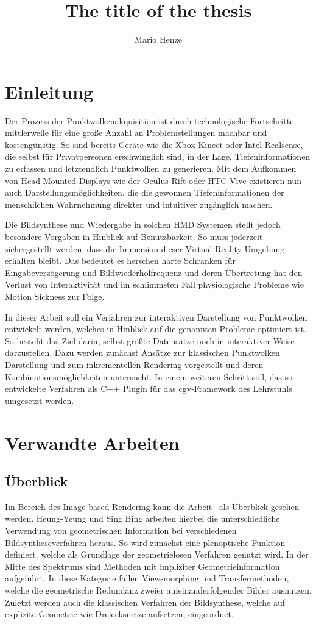 \documentclass[hyperref, beleg, german]{cgvpub}
\author{Mario Henze}
\title{The title of the thesis}
\begin{document}
\chapter{Einleitung}%
\label{sec:einleitung}

Der Prozess der Punktwolkenakquisition ist durch technologische Fortschritte
mittlerweile für eine große Anzahl an Problemstellungen machbar und
kostengünstig. So sind bereits Geräte wie die Xbox Kinect oder Intel
Realsense, die selbst für Privatpersonen erschwinglich sind, in der Lage,
Tiefeninformationen zu erfassen und letztendlich Punktwolken zu generieren. Mit
dem Aufkommen von Head Mounted Displays wie der Oculus Rift oder HTC Vive
existieren nun auch Darstellungsmöglichkeiten, die die gewonnen
Tiefeninformationen der menschlichen Wahrnehmung direkter und intuitiver
zugänglich machen.

Die Bildsynthese und Wiedergabe in solchen HMD Systemen stellt jedoch besondere
Vorgaben in Hinblick auf Benutzbarkeit. So muss jederzeit sichergestellt werden,
dass die Immersion dieser Virtual Reality Umgebung erhalten bleibt. Das bedeutet
es herschen harte Schranken für Eingabeverzögerung und Bildwiederholfrequenz und
deren Übertretung hat den Verlust von Interaktivität und im schlimmsten Fall
physiologische Probleme wie Motion Sickness zur Folge.

In dieser Arbeit soll ein Verfahren zur interaktiven Darstellung von Punktwolken
entwickelt werden, welches in Hinblick auf die genannten Probleme optimiert ist.
So besteht das Ziel darin, selbst größte Datensätze noch in interaktiver Weise
darzustellen. Dazu werden zunächst Ansätze zur klassischen Punktwolken
Darstellung und zum inkrementellen Rendering vorgestellt und deren
Kombinationsmöglichkeiten untersucht. In einem weiteren Schritt soll, das so
entwickelte Verfahren als C++ Plugin für das cgv-Framework des Lehrstuhls
umgesetzt werden.

\chapter{Verwandte Arbeiten}%
\label{sec:verwandte_arbeiten}

\section{Überblick}

Im Bereich des Image-based Rendering kann die Arbeit~\cite{shum2000review} als
Überblick gesehen werden. Heung-Yeung und Sing Bing arbeiten hierbei die
unterschiedliche Verwendung von geometrischen Information bei verschiedenen
Bildsyntheseverfahren heraus. So wird zunächst eine plenoptische Funktion
definiert, welche als Grundlage der geometrielosen Verfahren genutzt wird. In
der Mitte des Spektrums sind Methoden mit impliziter Geometrieinformation
aufgeführt. In diese Kategorie fallen View-morphing und Transfermethoden, welche
die geometrische Redundanz zweier aufeinanderfolgender Bilder ausnutzen. Zuletzt
werden auch die klassischen Verfahren der Bildsynthese, welche auf explizite
Geometrie wie Dreiecksnetze aufsetzen, eingeordnet.
\end{document}
